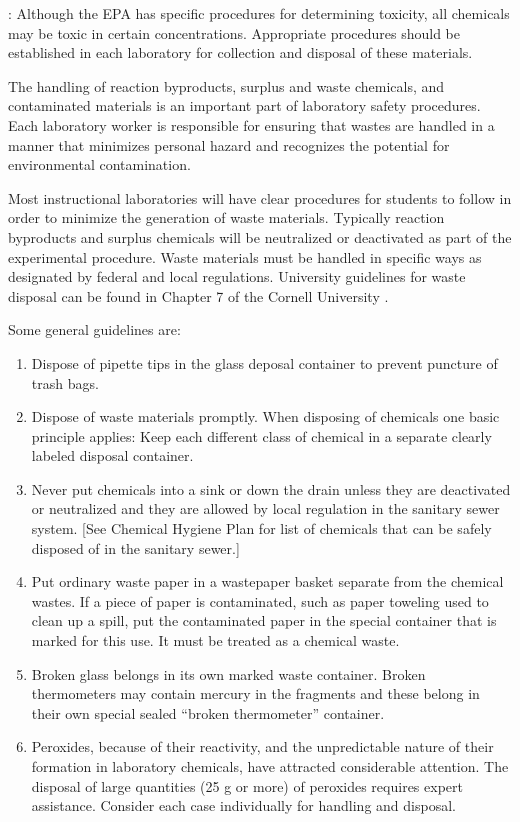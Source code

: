 \documentclass[letterpaper,10pt,english]{sphinxmanual}
\begin{document}
: Although the EPA has specific procedures for determining toxicity, all chemicals may be toxic in certain concentrations. Appropriate procedures should be established in each laboratory for collection and disposal of these materials.

The handling of reaction byproducts, surplus and waste chemicals, and contaminated materials is an important part of laboratory safety procedures. Each laboratory worker is responsible for ensuring that wastes are handled in a manner that minimizes personal hazard and recognizes the potential for environmental contamination.

Most instructional laboratories will have clear procedures for students to follow in order to minimize the generation of waste materials. Typically reaction byproducts and surplus chemicals will be neutralized or deactivated as part of the experimental procedure. Waste materials must be handled in specific ways as designated by federal and local regulations. University guidelines for waste disposal can be found in Chapter 7 of the Cornell University .

Some general guidelines are:
\begin{enumerate}
\item {} 
Dispose of pipette tips in the glass deposal container to prevent puncture of trash bags.

\item {} 
Dispose of waste materials promptly. When disposing of chemicals one basic principle applies: Keep each different class of chemical in a separate clearly labeled disposal container.

\item {} 
Never put chemicals into a sink or down the drain unless they are deactivated or neutralized and they are allowed by local regulation in the sanitary sewer system. {[}See Chemical Hygiene Plan for list of chemicals that can be safely disposed of in the sanitary sewer.{]}

\item {} 
Put ordinary waste paper in a wastepaper basket separate from the chemical wastes. If a piece of paper is contaminated, such as paper toweling used to clean up a spill, put the contaminated paper in the special container that is marked for this use. It must be treated as a chemical waste.

\item {} 
Broken glass belongs in its own marked waste container. Broken thermometers may contain mercury in the fragments and these belong in their own special sealed “broken thermometer” container.

\item {} 
Peroxides, because of their reactivity, and the unpredictable nature of their formation in laboratory chemicals, have attracted considerable attention. The disposal of large quantities (25 g or more) of peroxides requires expert assistance. Consider each case individually for handling and disposal.

\end{enumerate}
\end{document}

